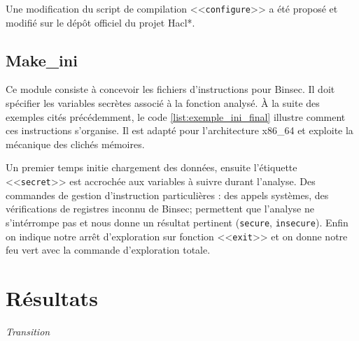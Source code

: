 Une modification du script de compilation <<\texttt{configure}>> a été proposé et modifié sur le dépôt officiel du projet Hacl*.

\subsection*{Make\_ini}

Ce module consiste à concevoir les fichiers d'instructions pour Binsec. Il doit spécifier les variables secrètes associé à la fonction analysé. À la suite des exemples cités précédemment, le code \ref{list:exemple_ini_final} illustre comment ces instructions s'organise. Il est adapté pour l'architecture x86\_64 et exploite la mécanique des clichés mémoires.\smallbreak

Un premier temps initie chargement des données, ensuite l'étiquette <<\texttt{secret}>> est accrochée aux variables à suivre durant l'analyse. Des commandes de gestion d'instruction particulières : des appels systèmes, des vérifications de registres inconnu de Binsec; permettent que l'analyse ne s'intérrompe pas et nous donne un résultat pertinent (\texttt{secure}, \texttt{insecure}). Enfin on indique notre arrêt d'exploration sur fonction <<\texttt{exit}>> et on donne notre feu vert avec la commande d'exploration totale.\medbreak

\section{Résultats}

\vfill
\textit{Transition}